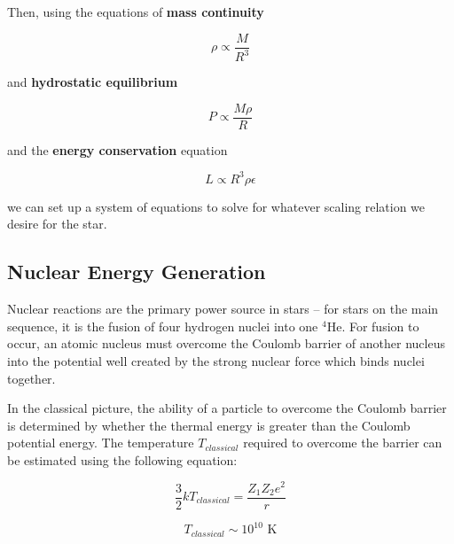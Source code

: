 Then, using the equations of \textbf{mass continuity}

\begin{equation}
\rho \propto \frac{M}{R^{3}}
\end{equation}

\noindent and \textbf{hydrostatic equilibrium}

\begin{equation}
P \propto \frac{M \rho}{R}
\end{equation}

\noindent and the \textbf{energy conservation} equation

\begin{equation}
L \propto R^3 \rho \epsilon
\end{equation}

\noindent we can set up a system of equations to solve for whatever scaling relation we desire for the star.


\subsection{Nuclear Energy Generation}

Nuclear reactions are the primary power source in stars -- for stars on the main sequence, it is the fusion of four hydrogen nuclei into one $^{4}$He.  For fusion to occur, an atomic nucleus must overcome the Coulomb barrier of another nucleus into the potential well created by the strong nuclear force which binds nuclei together.

In the classical picture, the ability of a particle to overcome the Coulomb barrier is determined by whether the thermal energy is greater than the Coulomb potential energy.  The temperature $T_{classical}$ required to overcome the barrier can be estimated using the following equation:

\begin{equation}
\frac{3}{2} k T_{classical} = \frac{Z_{1} Z_{2} e^2}{r}
\end{equation}

\begin{equation}
T_{classical} \sim 10^{10} \text{  K}
\end{equation}

